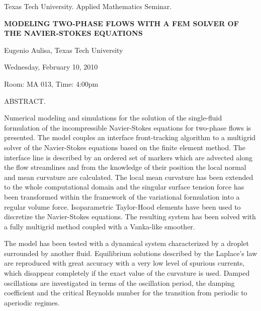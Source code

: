 \documentclass[oneside]{amsart}
\newcommand{\talktitle}{Modeling two-phase flows with a FEM solver of the Navier-Stokes equations}
\newcommand{\talkspeaker}{Eugenio Aulisa, Texas Tech University}
\newcommand{\talkdate}{Wednesday, February 10, 2010}
\newcommand{\talkabstract}{
Numerical modeling and simulations for the solution of the single-ﬂuid formulation of the incompressible Navier-Stokes equations for two-phase ﬂows
is presented. The model couples an interface front-tracking algorithm to a multigrid solver of the Navier-Stokes equations based on the ﬁnite
element method. The interface line is described by an ordered set of markers which are advected along the ﬂow streamlines and from the
knowledge of their position the local normal and mean curvature are calculated. The local mean curvature has been extended to the whole
computational domain and the singular surface tension force has been transformed within the framework of the variational formulation into a
regular volume force. Isoparametric Taylor-Hood elements have been used to discretize the Navier-Stokes equations. The resulting system
has been solved with a fully multigrid method coupled with a Vanka-like smoother.

The model has been tested with a dynamical system characterized by a droplet surrounded by another ﬂuid. Equilibrium solutions described by the Laplace’s law are reproduced with great accuracy with
a very low level of spurious currents, which disappear completely if the exact value of the curvature is used. Damped oscillations are investigated in terms of the oscillation period, the damping coeﬃcient
and the critical Reynolds number for the transition from periodic to aperiodic regimes.
}
\begin{document}
\thispagestyle{empty}

\begin{center}
Texas Tech University.  Applied Mathematics Seminar.

\end{center}

\begin{center}

\textbf{\LARGE {\uppercase{\talktitle}} }

\talkspeaker

\talkdate

Room: MA 013, Time: 4:00pm

\end{center}

ABSTRACT.
\talkabstract
\end{document}
